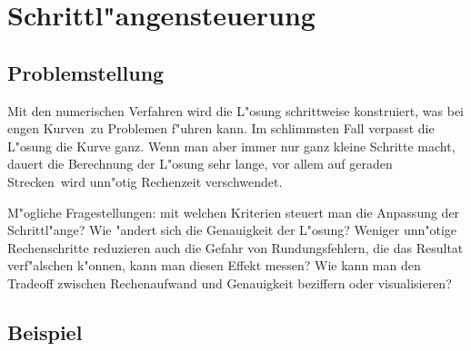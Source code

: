 \chapter{Schrittl"angensteuerung\label{chapter:thema}}
\begin{refsection}
\printbibliography[heading=subbibliography]


\section{Problemstellung}

Mit den numerischen Verfahren wird die L"osung schrittweise konstruiert, was bei \glqq engen Kurven\grqq~zu Problemen f"uhren kann.
Im schlimmsten Fall verpasst die L"osung die Kurve ganz.
Wenn man aber immer nur ganz kleine Schritte macht, dauert die Berechnung der L"osung sehr lange, vor allem auf \glqq geraden Strecken\grqq~wird unn"otig Rechenzeit verschwendet.

M"ogliche Fragestellungen: mit welchen Kriterien steuert man die Anpassung der Schrittl"ange?
Wie "andert sich die Genauigkeit der L"osung?
Weniger unn"otige Rechenschritte reduzieren auch die Gefahr von Rundungsfehlern, die das Resultat verf"alschen k"onnen, kann man diesen Effekt messen?
Wie kann man den Tradeoff zwischen Rechenaufwand und Genauigkeit beziffern oder visualisieren?


\section{Beispiel}


\end{refsection}
